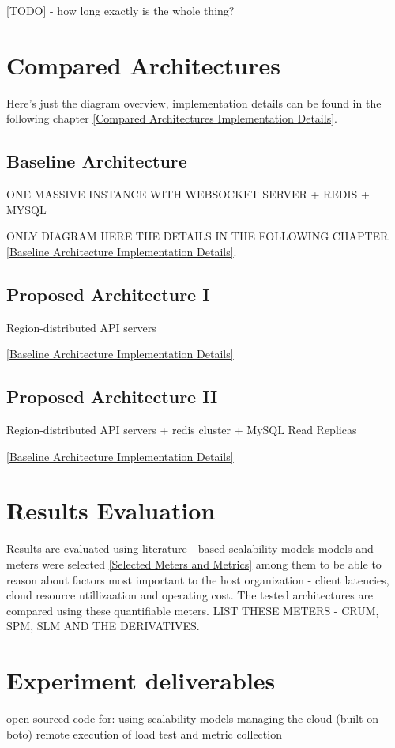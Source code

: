 \documentclass{uvamscse}
\begin{document}
[TODO] - how long exactly is the whole thing?

\section{Compared Architectures}\label{Compared Architectures}

Here's just the diagram overview, implementation details can be found in the following chapter \ref{Compared Architectures Implementation Details}.

\subsection{Baseline Architecture}\label{Baseline Architecture}
ONE MASSIVE INSTANCE WITH WEBSOCKET SERVER + REDIS + MYSQL

ONLY DIAGRAM HERE THE DETAILS IN THE FOLLOWING CHAPTER \ref{Baseline Architecture Implementation Details}.

\subsection{Proposed Architecture I}\label{Proposed Architecture I}
Region-distributed API servers

\ref{Baseline Architecture Implementation Details}

\subsection{Proposed Architecture II}\label{Proposed Architecture II}
Region-distributed API servers + redis cluster + MySQL Read Replicas

\ref{Baseline Architecture Implementation Details}

\section{Results Evaluation}
Results are evaluated using literature - based scalability models \cite{Models}
models and meters were selected \ref{Selected Meters and Metrics} among them to be able to reason about factors most important to the host organization - client latencies, cloud resource utillizaation and operating cost. The tested architectures are compared using these quantifiable meters. LIST THESE METERS - CRUM, SPM, SLM AND THE DERIVATIVES.

\section{Experiment deliverables}\label{Experiment deliverables}
open sourced code for:
using scalability models
managing the cloud (built on boto)
remote execution of load test and metric collection
\end{document}
